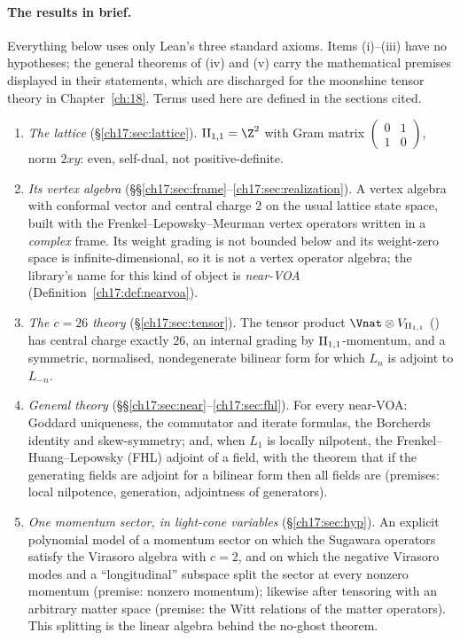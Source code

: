 \paragraph{The results in brief.}  Everything below uses only Lean's three standard axioms.  Items
(i)--(iii) have no hypotheses; the general theorems of (iv) and (v) carry the mathematical premises displayed in
their statements, which are discharged for the moonshine tensor theory in Chapter~\ref{ch:18}.  Terms used here
are defined in the sections cited.
\begin{enumerate}[label=(\roman*)]
\item \emph{The lattice} (\S\ref{ch17:sec:lattice}).  $\chseventeenII=\Z^2$ with Gram matrix
  $\left(\begin{smallmatrix}0&1\\1&0\end{smallmatrix}\right)$, norm $2xy$: even, self-dual, not positive-definite.
\item \emph{Its vertex algebra} (\S\S\ref{ch17:sec:frame}--\ref{ch17:sec:realization}).  A vertex algebra
   with conformal vector and central charge $2$ on the usual lattice state space, built
  with the Frenkel--Lepowsky--Meurman vertex operators written in a \emph{complex} frame.  Its weight grading is
  not bounded below and its weight-zero space is infinite-dimensional, so it is not a vertex operator algebra; the
  library's name for this kind of object is \emph{near-VOA} (Definition~\ref{ch17:def:nearvoa}).
\item \emph{The $c=26$ theory} (\S\ref{ch17:sec:tensor}).  The tensor product $\Vnat\otimes\chseventeenVII$
  () has central charge exactly $26$, an internal grading by ${\mathrm{II}_{1,1}}$-momentum,
  and a symmetric, normalised, nondegenerate bilinear form for which $L_n$ is adjoint to $L_{-n}$.
\item \emph{General theory} (\S\S\ref{ch17:sec:near}--\ref{ch17:sec:fhl}).  For every near-VOA: Goddard uniqueness,
  the commutator and iterate formulas, the Borcherds identity and skew-symmetry; and, when $L_1$ is locally
  nilpotent, the Frenkel--Huang--Lepowsky (FHL) adjoint of a field, with the theorem that if the generating fields
  are adjoint for a bilinear form then all fields are (premises: local nilpotence, generation, adjointness of
  generators).
\item \emph{One momentum sector, in light-cone variables} (\S\ref{ch17:sec:hyp}).  An explicit polynomial model of a
  momentum sector on which the Sugawara operators satisfy the Virasoro algebra with $c=2$, and on which the
  negative Virasoro modes and a ``longitudinal'' subspace split the sector at every nonzero momentum (premise:
  nonzero momentum); likewise after tensoring with an arbitrary matter space (premise: the Witt relations of the
  matter operators).  This splitting is the linear algebra behind the no-ghost theorem.
\end{enumerate}

